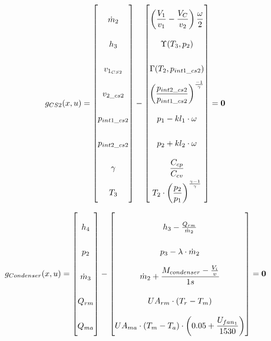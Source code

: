 \begin{equation} \label{eq:consump_x}\renewcommand{\arraystretch}{2.5}
	g_{CS2}(x,u) =  \begin{bmatrix}
		\dot{m}_2  		 	\\ %
		h_{3}				\\ %
		v_{1_{CS2}}			\\ %
		v_{2\_cs2}			\\ %
		p_{int1\_cs2}		\\ %
		p_{int2\_cs2}		\\ %
		\gamma				\\ %
		T_{3}				\\ %
	\end{bmatrix}
	-
	\begin{bmatrix}
		\left(\dfrac{V_1}{v_1} - \dfrac{V_C}{v_2}\right) \dfrac{\omega}{2} \\			%
		\Upsilon(T_{3}, p_{2})		\\													%
		\Gamma(T_{2},p_{int1\_cs2}) \\													%
		\left(\dfrac{p_{int2\_cs2}}{p_{int1\_cs2}}\right)^{\frac{-1}{\gamma}} \\		%
		p_{1} - kl_1 \cdot \omega \\													%
		p_{2} + kl_2 \cdot \omega \\													%
		\dfrac{C_{cp}}{C_{cv}} \\														%
		T_{2}\cdot \left(\dfrac{p_{2}}{p_{1}}\right)^{\frac{\gamma-1}{\gamma}}	\\		%
	\end{bmatrix}
	=\textbf{0}
\end{equation}


\begin{equation} \label{eq:consump_x}\renewcommand{\arraystretch}{2.5}
	g_{Condenser}(x,u) =  \begin{bmatrix}
		h_{4}				\\ %
		p_{2}				\\ %
		\dot{m}_{3}			\\ %
		Q_{rm}				\\
		Q_{ma}				\\
	\end{bmatrix}
	-
	\begin{bmatrix}
		h_{3} - \frac{Q_{rm}}{\dot{m}_{2}}	\\											%
		p_{3} - \lambda \cdot \dot{m}_{2}			\\									%
		\dot{m}_{2} + \dfrac{M_{condenser} - \frac{V_i}{v}}{1s}	\\						%
		U A_{rm} \cdot (T_r - T_m) \\
		U A_{ma} \cdot (T_m - T_a)\cdot \left(0.05 + \dfrac{U_{fan_1}}{1530}\right) \\
	\end{bmatrix}
	=\textbf{0}
\end{equation}




